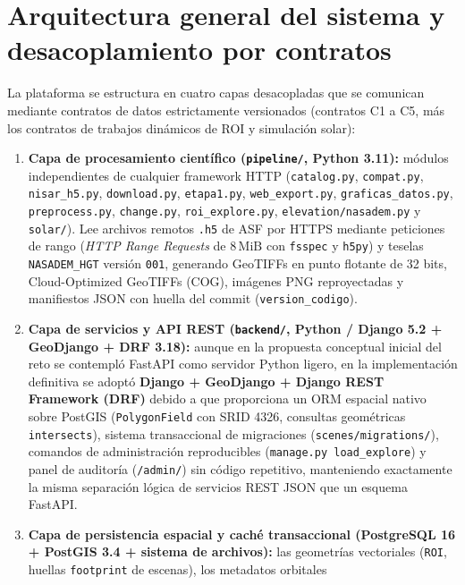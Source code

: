 \documentclass[11pt,a4paper]{article}
\newcommand{\src}[1]{\nolinkurl{#1}}
\newcommand{\unit}[1]{\mathrm{#1}}
\begin{document}
\section{Arquitectura general del sistema y desacoplamiento por contratos}
\label{sec:arq-general}

La plataforma se estructura en cuatro capas desacopladas que se comunican mediante contratos de datos
estrictamente versionados (contratos C1 a C5, más los contratos de trabajos dinámicos de ROI y simulación
solar):

\begin{enumerate}
  \item \textbf{Capa de procesamiento científico (\src{pipeline/}, Python 3.11):}
        módulos independientes de cualquier framework HTTP (\src{catalog.py}, \src{compat.py}, \src{nisar\_h5.py},
        \src{download.py}, \src{etapa1.py}, \src{web\_export.py}, \src{graficas\_datos.py}, \src{preprocess.py},
        \src{change.py}, \src{roi\_explore.py}, \src{elevation/nasadem.py} y \src{solar/}). Lee archivos remotos
        \texttt{.h5} de ASF por HTTPS mediante peticiones de rango (\emph{HTTP Range Requests} de $8\,\unit{MiB}$
        con \texttt{fsspec} y \texttt{h5py}) y teselas \texttt{NASADEM\_HGT} versión \texttt{001}, generando
        GeoTIFFs en punto flotante de 32 bits, Cloud-Optimized GeoTIFFs (COG), imágenes PNG reproyectadas y
        manifiestos JSON con huella del commit (\texttt{version\_codigo}).
  \item \textbf{Capa de servicios y API REST (\src{backend/}, Python / Django 5.2 + GeoDjango + DRF 3.18):}
        aunque en la propuesta conceptual inicial del reto se contempló FastAPI como servidor Python ligero, en
        la implementación definitiva se adoptó \textbf{Django + GeoDjango + Django REST Framework (DRF)} debido
        a que proporciona un ORM espacial nativo sobre PostGIS (\texttt{PolygonField} con SRID 4326, consultas
        geométricas \texttt{intersects}), sistema transaccional de migraciones (\src{scenes/migrations/}),
        comandos de administración reproducibles (\texttt{manage.py load\_explore}) y panel de auditoría
        (\texttt{/admin/}) sin código repetitivo, manteniendo exactamente la misma separación lógica de
        servicios REST JSON que un esquema FastAPI.
  \item \textbf{Capa de persistencia espacial y caché transaccional (PostgreSQL 16 + PostGIS 3.4 + sistema de archivos):}
        las geometrías vectoriales (\texttt{ROI}, huellas \texttt{footprint} de escenas), los metadatos orbitales

\end{enumerate}
\end{document}
